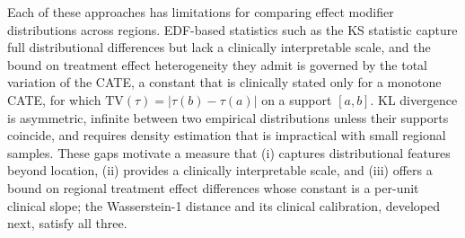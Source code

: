 \documentclass[AMA,Times1COL]{WileyNJDv5}
\begin{document}
Each of these approaches has limitations for comparing effect modifier distributions across regions. EDF-based statistics such as the KS statistic capture full distributional differences but lack a clinically interpretable scale, and the bound on treatment effect heterogeneity they admit is governed by the total variation of the CATE, a constant that is clinically stated only for a monotone CATE, for which $\mathrm{TV}(\tau) = |\tau(b) - \tau(a)|$ on a support $[a, b]$. KL divergence is asymmetric, infinite between two empirical distributions unless their supports coincide, and requires density estimation that is impractical with small regional samples. These gaps motivate a measure that (i) captures distributional features beyond location, (ii) provides a clinically interpretable scale, and (iii) offers a bound on regional treatment effect differences whose constant is a per-unit clinical slope; the Wasserstein-1 distance and its clinical calibration, developed next, satisfy all three.
\end{document}
